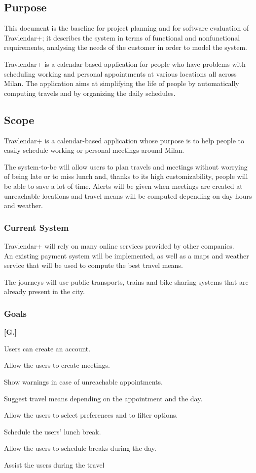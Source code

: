 \subsection{Purpose}
This document is the baseline for project planning and for software evaluation of Travlendar+; it describes the system in terms of functional and nonfunctional requirements, analysing the needs of the customer in order to model the system.

Travlendar+ is a calendar-based application for people who have problems with scheduling working and personal appointments at various locations all across Milan. The application aims at simplifying the life of people by automatically computing travels and by organizing the daily schedules.

\subsection{Scope}
Travlendar+ is a calendar-based application whose purpose is to help people to easily schedule working or personal meetings around Milan.

The system-to-be will allow users to plan travels and meetings without worrying of being late or to miss lunch and, thanks to its high customizability, people will be able to save a lot of time. Alerts will be given when meetings are created at unreachable locations and travel means will be computed depending on day hours and weather.

\subsubsection{Current System}
Travlendar+ will rely on many online services provided by other companies.\\
An existing payment system will be implemented, as well as a maps and weather service that will be used to compute the best travel means.

The journeys will use public transports, trains and bike sharing systems that are already present in the city.

\subsubsection{Goals}
\begin{list}
{\bfseries{}[G.]~}
{
}
\item Users can create an account.
\item
Allow the users to create meetings.
\item
Show warnings in case of unreachable appointments.
\item
Suggest travel means depending on the appointment and the day.
\item
Allow the users to select preferences and to filter options.
\item
Schedule the users’ lunch break.
\item
Allow the users to schedule breaks during the day.
\item
Assist the users during the travel

\end{list}

